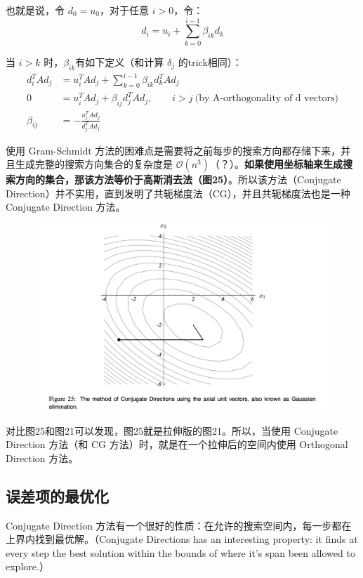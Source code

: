 \documentclass[12pt]{article}
\begin{document}
也就是说，令 $d_0 = u_0$，对于任意 $i > 0$，令：
$$
d_i = u_i + \sum_{k=0}^{i-1}\beta_{ik}d_k
$$

当 $i > k$ 时，$\beta_{ik}$有如下定义（和计算 $\delta_j$ 的trick相同）：
\begin{align*}
d^T_iAd_j &= u^T_iAd_j + \sum_{k=0}^{i-1}\beta_{ik}d^T_kAd_j \\
0 &= u^T_iAd_j + \beta_{ij}d^T_jAd_j,  \qquad i > j \ \text{(by A-orthogonality of d vectors)} \\
\beta_{ij} &= -\frac{u^T_iAd_j}{d^T_jAd_j}
\end{align*}

使用 Gram-Schmidt 方法的困难点是需要将之前每步的搜索方向都存储下来，并且生成完整的搜索方向集合的复杂度是 $\mathcal{O}(n^3)$（？）。\textbf{如果使用坐标轴来生成搜索方向的集合，那该方法等价于高斯消去法（图25）}。所以该方法（Conjugate Direction）并不实用，直到发明了共轭梯度法（CG），并且共轭梯度法也是一种 Conjugate Direction 方法。
\begin{figure}[H]
    \centering
    \includegraphics[width=1\textwidth]{fig/CG_Convergence_CD_4.png}
\end{figure}

对比图25和图21可以发现，图25就是拉伸版的图21。所以，当使用 Conjugate Direction 方法（和 CG 方法）时，就是在一个拉伸后的空间内使用 Orthogonal Direction 方法。

\subsection{误差项的最优化}
Conjugate Direction 方法有一个很好的性质：在允许的搜索空间内，每一步都在上界内找到最优解。（Conjugate Directions has an interesting property: it ﬁnds at every step the best solution within the bounds of where it’s span been allowed to explore.）
\end{document}

